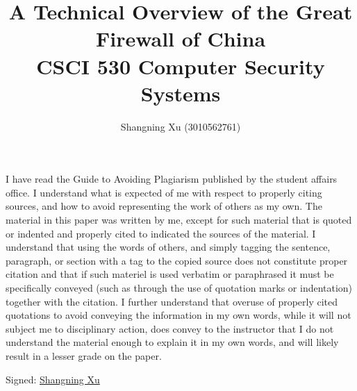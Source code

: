 \documentclass{article}
\title{
    A Technical Overview of the Great\\ Firewall of China\\
    \large CSCI 530 Computer Security Systems
}
\author{Shangning Xu (3010562761)}
\begin{document}
\maketitle

I have read the Guide to Avoiding Plagiarism published by the student affairs office. I understand what is expected of me with respect to properly citing sources, and how to avoid representing the work of others as my own. The material in this paper was written by me, except for such material that is quoted or indented and properly cited to indicated the sources of the material. I understand that using the words of others, and simply tagging the sentence, paragraph, or section with a tag to the copied source does not constitute proper citation and that if such materiel is used verbatim or paraphrased it must be specifically conveyed (such as through the use of quotation marks or indentation) together with the citation. I further understand that overuse of properly cited quotations to avoid conveying the information in my own words, while it will not subject me to disciplinary action, does convey to the instructor that I do not understand the material enough to explain it in my own words, and will likely result in a lesser grade on the paper.

Signed: \underline{Shangning Xu}
\end{document}
